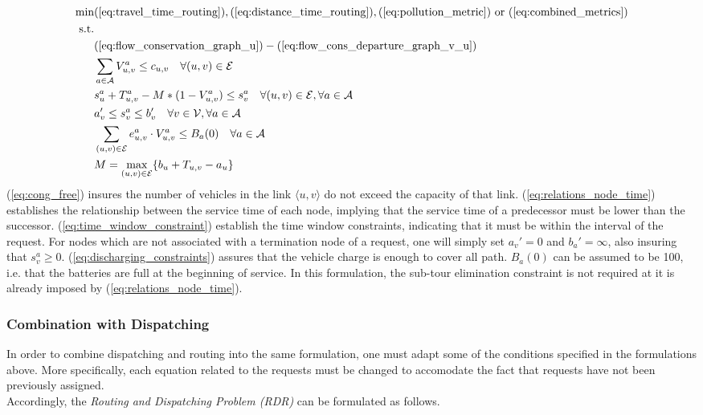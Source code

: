 \begin{align}
	\text{min}&  
		(\ref{eq:travel_time_routing}), (\ref{eq:distance_time_routing}), (\ref{eq:pollution_metric}) \text{ or } (\ref{eq:combined_metrics})
	\nonumber\\
	\text{s.t.} &\nonumber\\
	&(\ref{eq:flow_conservation_graph_u})-(\ref{eq:flow_cons_departure_graph_v_u})\nonumber\\
	&\sum_{a \in \mathcal{A}}V^a_{u,v} \leq c_{u,v} \quad \forall (u,v) \in \mathcal{E} \label{eq:cong_free}\\
	&s_{u}^a + T_{u,v}^a - M*(1-V^a_{u,v}) \leq s_{v}^a  \quad \forall (u,v) \in \mathcal{E}, \forall a \in \mathcal{A}\label{eq:relations_node_time}\\
	&a'_v \leq s_{v}^a \leq b'_v \quad \forall v \in \mathcal{V}, \forall a \in \mathcal{A}\label{eq:time_window_constraint}\\
	&\sum_{(u,v) \in \mathcal{E}}e^a_{u,v}\cdot V^a_{u,v} \leq B_a(0)\quad \forall a \in \mathcal{A} \label{eq:discharging_constraints}\\
	&M= \underset{(u,v) \in \mathcal{E}}{\text{max}}\{b_u + T_{u,v}-a_u\}\nonumber
\end{align} 
(\ref{eq:cong_free}) insures the number of vehicles in the link $\langle u,v\rangle$ do not exceed the capacity of that link. (\ref{eq:relations_node_time}) establishes the relationship between the service time of each node, implying that the service time of a predecessor must be lower than the successor. (\ref{eq:time_window_constraint}) establish the time window constraints, indicating that it must be within the interval of the request. For nodes which are not associated with a termination node of a  request, one will simply set $a_v' = 0 $ and $b_a' = \infty$, also insuring that $s_v^a \ge 0 $. (\ref{eq:discharging_constraints}) assures that the vehicle charge is enough to cover all path. $B_a(0)$ can be assumed to be 100, i.e. that the batteries are full at the beginning of service. In this formulation, the sub-tour elimination constraint is not required at it is already imposed by (\ref{eq:relations_node_time}). 
\subsubsection*{Combination with Dispatching}
In order to combine dispatching and routing into the same formulation, one must adapt some of the conditions specified in the formulations above. More specifically, each equation related to the requests must be changed to accomodate the fact that requests have not been previously assigned. \\
Accordingly, the \textit{Routing and Dispatching Problem (RDR)} can be formulated as follows. 

